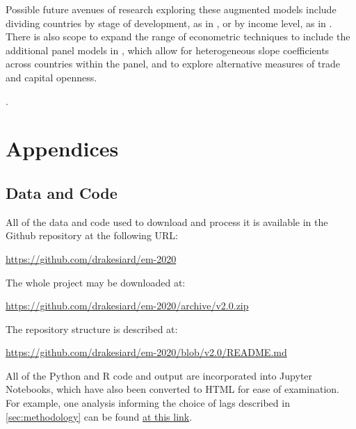 \documentclass[12pt,a4paper]{article}
\begin{document}
Possible future avenues of research exploring these augmented models include dividing countries by stage of development, as in \cite{rafiqUrbanizationOpennessEmissions2016}, or by income level, as in \cite{tibaIncomeTradeOpenness2018}.
There is also scope to expand the range of econometric techniques to include the additional panel models in \cite{rafiqUrbanizationOpennessEmissions2016}, which allow for heterogeneous slope coefficients across countries within the panel, and to explore alternative measures of trade and capital openness. 

\clearpage

\appendix

\renewcommand{\refname}{\section{References}\label{sec:references}}.


\clearpage

\section{Appendices}

\subsection{Data and Code}\label{sec:data_and_code}

All of the data and code used to download and process it is available in the Github repository at the following URL:

\url{https://github.com/drakesiard/em-2020}

\noindent
The whole project may be downloaded at:

\url{https://github.com/drakesiard/em-2020/archive/v2.0.zip}

\noindent
The repository structure is described at:

\url{https://github.com/drakesiard/em-2020/blob/v2.0/README.md}

\noindent
All of the Python and R code and output are incorporated into Jupyter Notebooks, which have also been converted to HTML for ease of examination. For example, one analysis informing the choice of lags described in \cref{sec:methodology} can be found
\href{https://htmlpreview.github.io/?https://github.com/drakesiard/em-2020/blob/master/analysis/D3_gmm/diffGMM_Rafiq2016-CTS_subset_lag2.html}{at this link}.
\end{document}
